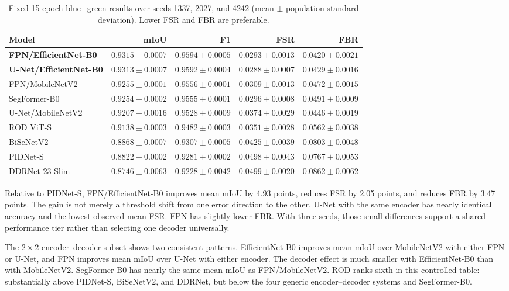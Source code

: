 \begin{table}[H]
\centering
\caption{Fixed-15-epoch blue+green results over seeds 1337, 2027, and 4242
(mean $\pm$ population standard deviation). Lower FSR and FBR are preferable.}
\label{tab:wider_blue_green}
\footnotesize
\setlength{\tabcolsep}{4pt}
\begin{tabular}{@{}lrrrr@{}}
\toprule
\textbf{Model} & \textbf{mIoU} & \textbf{F1} & \textbf{FSR} & \textbf{FBR} \\
\midrule
\textbf{FPN/EfficientNet-B0} & $\mathbf{0.9315\pm0.0007}$ & $\mathbf{0.9594\pm0.0005}$ & $0.0293\pm0.0013$ & $\mathbf{0.0420\pm0.0021}$ \\
\textbf{U-Net/EfficientNet-B0} & $\mathbf{0.9313\pm0.0007}$ & $\mathbf{0.9592\pm0.0004}$ & $\mathbf{0.0288\pm0.0007}$ & $0.0429\pm0.0016$ \\
FPN/MobileNetV2 & $0.9255\pm0.0001$ & $0.9556\pm0.0001$ & $0.0309\pm0.0013$ & $0.0472\pm0.0015$ \\
SegFormer-B0 & $0.9254\pm0.0002$ & $0.9555\pm0.0001$ & $0.0296\pm0.0008$ & $0.0491\pm0.0009$ \\
U-Net/MobileNetV2 & $0.9207\pm0.0016$ & $0.9528\pm0.0009$ & $0.0374\pm0.0029$ & $0.0446\pm0.0019$ \\
ROD ViT-S & $0.9138\pm0.0003$ & $0.9482\pm0.0003$ & $0.0351\pm0.0028$ & $0.0562\pm0.0038$ \\
BiSeNetV2 & $0.8868\pm0.0007$ & $0.9307\pm0.0005$ & $0.0425\pm0.0039$ & $0.0803\pm0.0048$ \\
PIDNet-S & $0.8822\pm0.0002$ & $0.9281\pm0.0002$ & $0.0498\pm0.0043$ & $0.0767\pm0.0053$ \\
DDRNet-23-Slim & $0.8746\pm0.0063$ & $0.9228\pm0.0042$ & $0.0499\pm0.0020$ & $0.0862\pm0.0062$ \\
\bottomrule
\end{tabular}
\end{table}

Relative to PIDNet-S, FPN/EfficientNet-B0 improves mean mIoU by 4.93 points,
reduces FSR by 2.05 points, and reduces FBR by 3.47 points. The gain is not
merely a threshold shift from one error direction to the other. U-Net with the
same encoder has nearly identical accuracy and the lowest observed mean FSR.
FPN has slightly lower FBR. With three seeds, those small differences support
a shared performance tier rather than selecting one decoder universally.

The $2\times2$ encoder--decoder subset shows two consistent patterns.
EfficientNet-B0 improves mean mIoU over MobileNetV2 with either FPN or U-Net,
and FPN improves mean mIoU over U-Net with either encoder. The decoder effect
is much smaller with EfficientNet-B0 than with MobileNetV2. SegFormer-B0 has
nearly the same mean mIoU as FPN/MobileNetV2. ROD ranks sixth in this
controlled table: substantially above PIDNet-S, BiSeNetV2, and DDRNet, but
below the four generic encoder--decoder systems and SegFormer-B0.

